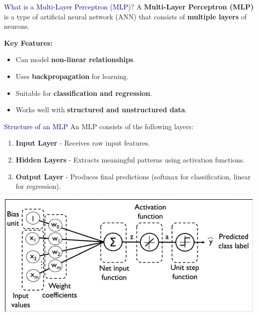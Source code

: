 \begin{frame}{\textcolor{darkblue}{What is a Multi-Layer Perceptron (MLP)?}}
    A \textbf{Multi-Layer Perceptron (MLP)} is a type of artificial neural network (ANN) that consists of \textbf{multiple layers} of neurons.

    \vspace{0.3cm}
    \textbf{Key Features:}
    \begin{itemize}
        \item Can model \textbf{non-linear relationships}.
        \item Uses \textbf{backpropagation} for learning.
        \item Suitable for \textbf{classification and regression}.
        \item Works well with \textbf{structured and unstructured data}.
    \end{itemize}
\end{frame}

\begin{frame}{\textcolor{darkblue}{Structure of an MLP}}
    An MLP consists of the following layers:

    \begin{enumerate}
        \item \textbf{Input Layer} - Receives raw input features.
        \item \textbf{Hidden Layers} - Extracts meaningful patterns using activation functions.
        \item \textbf{Output Layer} - Produces final predictions (softmax for classification, linear for regression).
    \end{enumerate}

    \centering
    \includegraphics[width=0.6\linewidth]{Sections/TP3/Images/MLP.jpg}
\end{frame}

